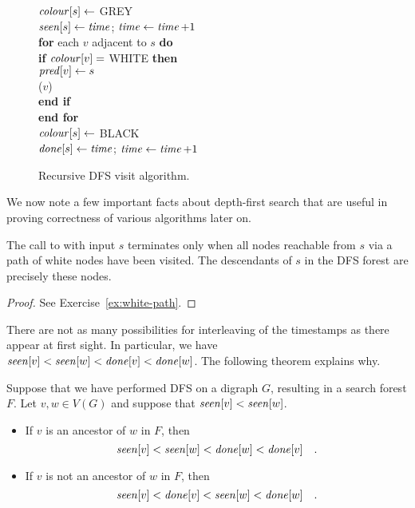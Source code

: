 \begin{figure}[htbp]
\hspace*{1.3in}\begin{minipage}{5in}
{
\> $\operatorname{\text{\textit{colour}}}[s] \gets $ GREY \\
\> $\operatorname{\text{\textit{seen}}}[s] \gets \operatorname{\text{\textit{time}}}$; $\operatorname{\text{\textit{time}}} \gets \operatorname{\text{\textit{time}}} + 1$ \\
\> \textbf{for} each $v$ adjacent to $s$ \textbf{do} \\
\> \> \textbf{if} $\operatorname{\text{\textit{colour}}}[v] = $ WHITE \textbf{then} \\
\> \> \> $\operatorname{\text{\textit{pred}}}[v] \gets s$ \\
\> \> \> ($v$) \\
\> \> \textbf{end if} \\
\> \textbf{end for} \\
\> $\operatorname{\text{\textit{colour}}}[s] \gets $ BLACK \\
\> $\operatorname{\text{\textit{done}}}[s] \gets \operatorname{\text{\textit{time}}} $; $\operatorname{\text{\textit{time}}} \gets \operatorname{\text{\textit{time}}} + 1$ \\
}
\end{minipage}
\caption{Recursive DFS visit algorithm.}
\label{fig:DFSreccode}
\end{figure}

We now note a few important facts about depth-first search that are
useful in proving correctness of various algorithms later on. 

\begin{Theorem} \label{thm:white-path} 
The call to 
with input $s$ terminates only when all nodes reachable from $s$ via
a path of white nodes have been visited. The descendants of $s$ in the
DFS forest are precisely these nodes.
\end{Theorem}

\begin{proof}
See Exercise~\ref{ex:white-path}.
\end{proof}

There are not as many possibilities for interleaving of the timestamps
as there appear at first sight. In particular, we 
have $\operatorname{\text{\textit{seen}}}[v] < \operatorname{\text{\textit{seen}}}[w] < \operatorname{\text{\textit{done}}}[v] < \operatorname{\text{\textit{done}}}[w]$. The following theorem
explains why.

\begin{Theorem}
\label{thm:DFS-seen-done}
Suppose that we have performed DFS on a digraph $G$, resulting in a 
search forest $F$. Let $v, w \in V(G)$ and suppose that $\operatorname{\text{\textit{seen}}}[v] < \operatorname{\text{\textit{seen}}}[w]$. 

\begin{itemize}
\item
If $v$ is an ancestor of $w$ in $F$, then 
$$\operatorname{\text{\textit{seen}}}[v] < \operatorname{\text{\textit{seen}}}[w] < \operatorname{\text{\textit{done}}}[w] < \operatorname{\text{\textit{done}}}[v] \quad .$$
\item
If $v$ is not an ancestor of $w$ in $F$, then
$$\operatorname{\text{\textit{seen}}}[v] < \operatorname{\text{\textit{done}}}[v]  < \operatorname{\text{\textit{seen}}}[w] < \operatorname{\text{\textit{done}}}[w] \quad .$$
\end{itemize}
\end{Theorem}

